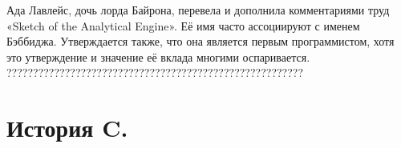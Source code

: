 Ада Лавлейс, дочь лорда Байрона, перевела и дополнила комментариями труд «Sketch of the Analytical Engine». 
Её имя часто ассоциируют с именем Бэббиджа. Утверждается также, что она является первым программистом, 
хотя это утверждение и значение её вклада многими оспаривается.\\
 ????????????????????????????????????????????????????????\\
\section{История C.}